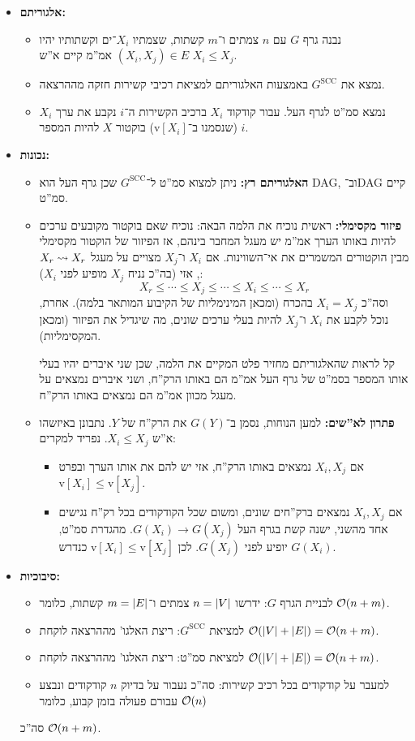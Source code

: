 \documentclass[]{../../../../tex/classes/homework}
\newcommand\gcc{G^{\mathrm{SCC}}}
\begin{document}
	\begin{itemize}
		\item \textbf{אלגוריתם: }
		\begin{itemize}
			\item נבנה גרף $G$ עם $n$ צמתים ו־$m$ קשתות, שצמתיו $X_i$־ים וקשתותיו יהיו $(X_i, X_j) \in E$ אמ''מ קיים א''ש $X_i \le X_j$. 
			\item נמצא את $\gcc$ באמצעות האלגוריתם למציאת רכיבי קשירות חזקה מההרצאה. 
			\item נמצא סמ''ט לגרף העל. עבור קודקוד $X_i$ ברכיב הקשירות ה־$i$ נקבע את ערך $X_i$ (שנסמנו ב־$\mathrm v[X_i]$) בוקטור $X$ להיות המספר $i$. 
		\end{itemize}
		\item \textbf{נכונות: }
		\begin{itemize}
			\item \textbf{האלגוריתם רץ: }ניתן למצוא סמ''ט ל־$\gcc$ שכן גרף העל הוא DAG, וב־DAG קיים סמ''ט. 
			\item \textbf{פיזור מקסימלי: }ראשית נוכיח את הלמה הבאה: נוכיח שאם בוקטור מקובעים ערכים להיות באותו הערך אמ''מ יש מעגל המחבר בינהם, אז הפיזור של הוקטור מקסימלי מבין הוקטורים המשמרים את אי־השווינות. 
			אם $X_i$ ו־$X_j$ מצויים על מעגל $X_r \rightsquigarrow X_r$, אזי (בה''כ נניח $X_j$ מופיע לפני $X_i$): 
			\[ X_r \le \cdots \le X_j \le \cdots \le X_i \le \cdots \le X_r \]
			וסה''כ $X_i = X_j$ בהכרח (ומכאן המינימליות של הקיבוע המותאר בלמה). אחרת, נוכל לקבע את $X_i$ ו־$X_j$ להיות בעלי ערכים שונים, מה שיגדיל את הפיזור (ומכאן המקסימליות). 
			
			קל לראות שהאלגוריתם מחזיר פלט המקיים את הלמה, שכן שני איברים יהיו בעלי אותו המספר בסמ''ט של גרף העל אמ''מ הם באותו הרק''ח, ושני איברים נמצאים על מעגל מכוון אמ''מ הם נמצאים באותו הרק''ח. 
			\item \textbf{פתרון לא''שים: }למען הנוחות, נסמן ב־$G(Y)$ את הרק''ח של $Y$. נתבונן באיזשהו א''ש $X_i \le X_j$. נפריד למקרים: 
			\begin{itemize}[*]
				\item אם $X_i, X_j$ נמצאים באותו הרק''ח, אזי יש להם את אותו הערך ובפרט $\mathrm v[X_i] \le \mathrm v[X_j]$. 
				\item אם $X_i, X_j$ נמצאים ברק''חים שונים, ומשום שכל הקודקודים בכל רק''ח נגישים אחד מהשני, ישנה קשת בגרף העל $G(X_i) \to G(X_j)$. מהגדרת סמ''ט, $G(X_i)$ יופיע לפני $G(X_j)$. לכן $\mathrm v [X_i] \le \mathrm v [X_j]$ כנדרש. 
			\end{itemize}
		\end{itemize}
		\item \textbf{סיבוכיות: }
		\begin{itemize}
			\item לבניית הגרף $G$: ידרשו $n = \left \lvert V \right \rvert$ צמתים ו־$m = \left \lvert E \right \rvert$ קשתות, כלומר $\mathcal{O}(n + m)$. 
			\item למציאת $\gcc$: ריצת האלגו' מההרצאה לוקחת $\mathcal{O}(\left \lvert V \right \rvert + \left \lvert E \right \rvert) = \mathcal{O}(n + m)$. 
			\item למציאת סמ''ט: ריצת האלגו' מההרצאה לוקחת $\mathcal{O}(\left \lvert V \right \rvert + \left \lvert E \right \rvert) = \mathcal{O}(n + m)$. 
			\item למעבר על קודקודים בכל רכיב קשירות: סה''כ נעבור על בדיוק $n$ קודקודים ונבצע עבורם פעולה בזמן קבוע, כלומר $\mathcal{O}(n)$
		\end{itemize}
		סה''כ $\mathcal{O}(n + m)$. 
	\end{itemize}
\end{document}
